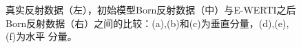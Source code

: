 \begin{figure}[!htb]
   \caption{真实反射数据（左），初始模型Born反射数据（中）与E-WERTI之后Born反射数据（右）之间的比较：(a),(b)和(c)为垂直分量，(d),(e),(f)为水平
   分量。}
   \label{fig:Data_comparison}
\end{figure}

